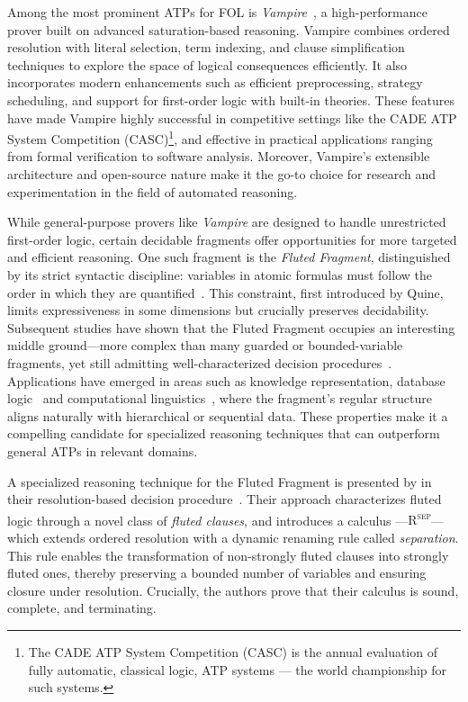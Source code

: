 Among the most prominent ATPs for FOL is \emph{Vampire}~\cite{kovacs2013vampire}, a high-performance prover built on advanced saturation-based reasoning.
Vampire combines ordered resolution with literal selection, term indexing, and clause simplification techniques to explore the space of logical consequences efficiently.
It also incorporates modern enhancements such as efficient preprocessing, strategy scheduling, and support for first-order logic with built-in theories.
These features have made Vampire highly successful in competitive settings like the CADE ATP System Competition (CASC)\footnote{The CADE ATP System Competition (CASC) is the annual evaluation of fully automatic, classical logic, ATP systems --- the world championship for such systems.}, and effective in practical applications ranging from formal verification to software analysis.
Moreover, Vampire's extensible architecture and open-source nature make it the go-to choice for research and experimentation in the field of automated reasoning.

While general-purpose provers like \emph{Vampire} are designed to handle unrestricted first-order logic, certain decidable fragments offer opportunities for more targeted and efficient reasoning.
One such fragment is the \emph{Fluted Fragment}, distinguished by its strict syntactic discipline: variables in atomic formulas must follow the order in which they are quantified~\cite{quine1968predicate}.
This constraint, first introduced by Quine, limits expressiveness in some dimensions but crucially preserves decidability. Subsequent studies have shown that the Fluted Fragment occupies an interesting middle ground—more complex than many guarded or bounded-variable fragments, yet still admitting well-characterized decision procedures~\cite{pratt2019fluted}.
Applications have emerged in areas such as knowledge representation, database logic~\cite{pratt-hartmann2023transitivity} and computational linguistics~\cite{quine1968predicate}, where the fragment’s regular structure aligns naturally with hierarchical or sequential data.
These properties make it a compelling candidate for specialized reasoning techniques that can outperform general ATPs in relevant domains.

A specialized reasoning technique for the Fluted Fragment is presented by \citeauthor{schmidt2000resolution} in their resolution-based decision procedure~\cite{schmidt2000resolution}.
Their approach characterizes fluted logic through a novel class of \emph{fluted clauses}, and introduces a calculus ---\textsc{R\textsuperscript{sep}}--- which extends ordered resolution with a dynamic renaming rule called \emph{separation}.
This rule enables the transformation of non-strongly fluted clauses into strongly fluted ones, thereby preserving a bounded number of variables and ensuring closure under resolution.
Crucially, the authors prove that their calculus is sound, complete, and terminating.

